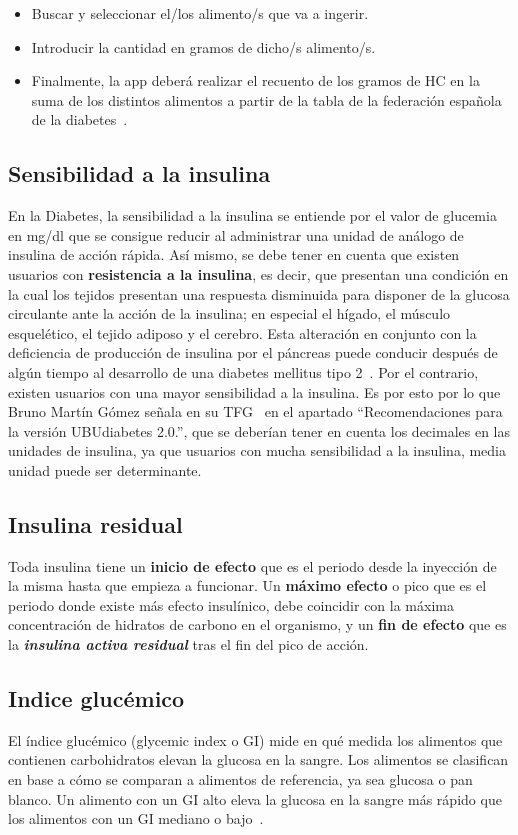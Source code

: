 \begin{itemize}
	\item Buscar y seleccionar el/los alimento/s que va a ingerir.
	\item Introducir la cantidad en gramos de dicho/s alimento/s.
	\item Finalmente, la app deberá realizar el recuento de los gramos de HC en la suma de los distintos alimentos a partir de la tabla de la federación española de la diabetes~\cite{tablafe}.
\end{itemize}
\subsection{Sensibilidad a la insulina}
En la Diabetes, la sensibilidad a la insulina se entiende por el valor de glucemia en mg/dl que se consigue reducir al administrar una unidad de análogo de insulina de acción rápida.
Así mismo, se debe tener en cuenta que existen usuarios con \textbf{resistencia a la insulina}, es decir, que presentan una condición en la cual los tejidos presentan una respuesta disminuida para disponer de la glucosa circulante ante la acción de la insulina; en especial el hígado, el músculo esquelético, el tejido adiposo y el cerebro. Esta alteración en conjunto con la deficiencia de producción de insulina por el páncreas puede conducir después de algún tiempo al desarrollo de una diabetes mellitus tipo 2~\cite{resistenciaIns}.
Por el contrario, existen usuarios con una mayor sensibilidad a la insulina. Es por esto por lo que Bruno Martín Gómez señala en su TFG~\cite{bruno2017} en el apartado ``Recomendaciones para la versión UBUdiabetes 2.0.'', que se deberían tener en cuenta los decimales en las unidades de insulina, ya que usuarios con mucha sensibilidad a la insulina, media unidad puede ser determinante.

\subsection{Insulina residual}
Toda insulina tiene un \textbf{inicio de efecto} que es el periodo desde la inyección de la misma hasta que empieza a funcionar. Un \textbf{máximo efecto} o pico que es el periodo donde existe más efecto insulínico, debe coincidir con la máxima concentración de hidratos de carbono en el organismo, y un \textbf{fin de efecto} que es la \textbf{\textit{insulina activa residual}} tras el fin del pico de acción.
\subsection{Indice glucémico}
El índice glucémico (glycemic index o GI) mide en qué medida los alimentos que contienen carbohidratos elevan la glucosa en la sangre.
Los alimentos se clasifican en base a cómo se comparan a alimentos de referencia, ya sea glucosa o pan blanco. Un alimento con un GI alto eleva la glucosa en la sangre más rápido que los alimentos con un GI mediano o bajo~\cite{indicegluce}.
